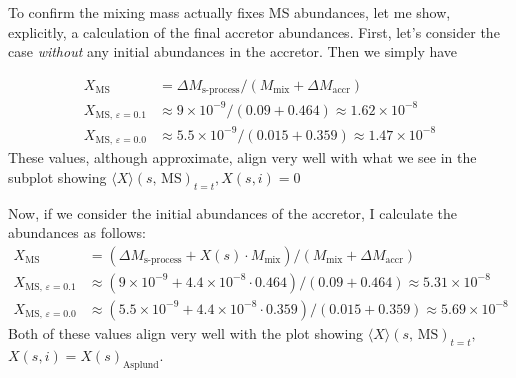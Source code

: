 \documentclass[a4paper,10pt]{article}
\begin{document}
To confirm the mixing mass actually fixes MS abundances, let me show, explicitly,
a calculation of the final accretor abundances.
First, let's consider the
case \emph{without} any initial abundances in the accretor.
Then we simply have

\begin{align*}
	X_\text{MS}                       & = \Delta M_\text{s-process} / (M_\text{mix} + \Delta M_\text{accr})        \\
	X_\text{MS, \(\varepsilon =0.1\)} & \approx 9 \times  10^{-9} / (0.09 + 0.464) \approx 1.62 \times  10^{-8}    \\
	X_\text{MS, \(\varepsilon =0.0\)} & \approx 5.5 \times  10^{-9} / (0.015 + 0.359) \approx 1.47 \times  10^{-8}
\end{align*}
These values, although approximate, align very well with what we see in the subplot showing \(\langle X \rangle (s\text{, MS} )_{t=t}, X(s,i) = 0 \)

\begin{figure}[ht]
	\centering
\end{figure}

Now, if we consider the initial abundances of the accretor, I calculate the abundances as follows:
\begin{align*}
	X_\text{MS}                       & = (\Delta M_\text{s-process} + X(s) \cdot M_\text{mix}) / (M_\text{mix} + \Delta M_\text{accr})              \\
	X_\text{MS, \(\varepsilon =0.1\)} & \approx (9 \times  10^{-9} + 4.4 \times 10^{-8} \cdot 0.464 ) / (0.09 + 0.464) \approx 5.31 \times  10^{-8}  \\
	X_\text{MS, \(\varepsilon =0.0\)} & \approx (5.5 \times  10^{-9}+ 4.4 \times 10^{-8} \cdot 0.359) / (0.015 + 0.359) \approx 5.69 \times  10^{-8}
\end{align*}
Both of these values align very well with the plot showing \(\langle X \rangle (s\text{, MS} )_{t=t},\)\\\(X(s,i) = X(s)_\text{Asplund}\).
\end{document}
